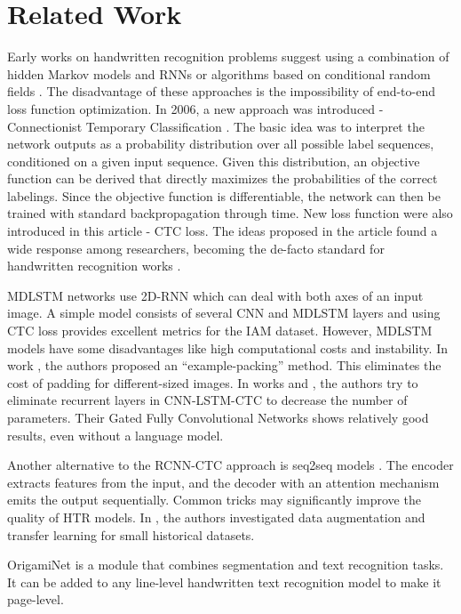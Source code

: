 \documentclass[10pt,twocolumn,letterpaper]{article}
\begin{document}
\section{Related Work}

Early works on handwritten recognition problems suggest using a combination of hidden Markov models and RNNs \cite{bengio1999,bourlard1994} or algorithms based on conditional random fields \cite{lafferty2001}. The disadvantage of these approaches is the impossibility of end-to-end loss function optimization.
In 2006, a new approach was introduced - Connectionist Temporary Classification \cite{CTC}. The basic idea was to interpret the network outputs as a probability distribution over all possible label sequences, conditioned on a given input sequence. Given this distribution, an objective function can be derived that directly maximizes the probabilities of the correct labelings. Since the objective function is differentiable, the network can then be trained with standard backpropagation through time. New loss function were also introduced in this article - CTC loss. The ideas proposed in the article found a wide response among researchers, becoming the de-facto standard for handwritten recognition works \cite{gramCTC,HWRfew,de2019no}.

MDLSTM \cite{voigtlaender2016handwriting} networks use 2D-RNN which can deal with both axes of an input image. A simple model consists of several CNN and MDLSTM layers and using CTC loss provides excellent metrics for the IAM \cite{marti2002iam} dataset. However, MDLSTM models have some disadvantages like high computational costs and instability. In work \cite{de2019no}, the authors proposed an “example-packing” method. This eliminates the cost of padding for different-sized images. In works \cite{coquenet2020recurrence} and \cite{ingle2019scalable}, the authors try to eliminate recurrent layers in CNN-LSTM-CTC to decrease the number of parameters. Their Gated Fully Convolutional Networks shows relatively good results, even without a language model.

Another alternative to the RCNN-CTC approach is seq2seq models \cite{michael2019evaluating}. The encoder extracts features from the input, and the decoder with an attention mechanism emits the output sequentially. Common tricks may significantly improve the quality of HTR models. In \cite{aradillas2020boosting}, the authors investigated data augmentation and transfer learning for small historical datasets. 

OrigamiNet \cite{yousef2020origaminet} is a module that combines segmentation and text recognition tasks. It can be added to any line-level handwritten text recognition model to make it page-level.
\end{document}
